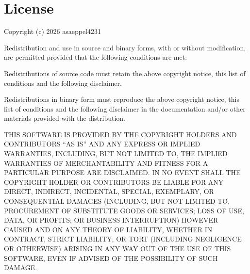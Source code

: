 \chapter{License}
\hypertarget{md_LICENSE}{}\label{md_LICENSE}
\label{md_LICENSE_autotoc_md0}%
%
 Copyright (c) 2026 asaeppel4231

Redistribution and use in source and binary forms, with or without modification, are permitted provided that the following conditions are met\+:


\begin{DoxyEnumerate}
\item Redistributions of source code must retain the above copyright notice, this list of conditions and the following disclaimer.
\item Redistributions in binary form must reproduce the above copyright notice, this list of conditions and the following disclaimer in the documentation and/or other materials provided with the distribution.
\end{DoxyEnumerate}

THIS SOFTWARE IS PROVIDED BY THE COPYRIGHT HOLDERS AND CONTRIBUTORS “\+AS IS” AND ANY EXPRESS OR IMPLIED WARRANTIES, INCLUDING, BUT NOT LIMITED TO, THE IMPLIED WARRANTIES OF MERCHANTABILITY AND FITNESS FOR A PARTICULAR PURPOSE ARE DISCLAIMED. IN NO EVENT SHALL THE COPYRIGHT HOLDER OR CONTRIBUTORS BE LIABLE FOR ANY DIRECT, INDIRECT, INCIDENTAL, SPECIAL, EXEMPLARY, OR CONSEQUENTIAL DAMAGES (INCLUDING, BUT NOT LIMITED TO, PROCUREMENT OF SUBSTITUTE GOODS OR SERVICES; LOSS OF USE, DATA, OR PROFITS; OR BUSINESS INTERRUPTION) HOWEVER CAUSED AND ON ANY THEORY OF LIABILITY, WHETHER IN CONTRACT, STRICT LIABILITY, OR TORT (INCLUDING NEGLIGENCE OR OTHERWISE) ARISING IN ANY WAY OUT OF THE USE OF THIS SOFTWARE, EVEN IF ADVISED OF THE POSSIBILITY OF SUCH DAMAGE. 